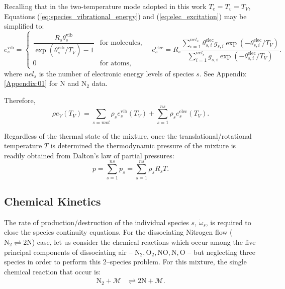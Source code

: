 \documentclass[10pt]{article}
\newcommand{\elec}{\text{elec}}
\newcommand{\vib}{\text{vib}}
\begin{document}
Recalling that  in the two-temperature mode adopted in this work $T_e=T_v= T_V$, Equations (\ref{eq:species_vibrational_energy}) and (\ref{eq:elec_excitation}) may be simplified to:
\begin{equation*}
  e^{\text{vib}}_s = 
  \begin{cases}    
    \dfrac{R_s\theta^{\vib}_{s}}{\exp\left(\theta^{\vib}_{s}/T_V\right) - 1} & \text{for molecules}, \\
    0 & \text{for atoms},
  \end{cases}
\quad
e^{\elec}_s = R_s \dfrac{\sum_{i=1}^{nel_s} \theta^{\elec}_{s,i} g_{s,i} \exp\left(-\theta^{\elec}_{s,i}/T_V\right)}{ \sum_{i=1}^{nel_s} g_{s,i} \exp\left(-\theta^{\elec}_{s,i}/T_V\right)}.
\end{equation*}
where $nel_s$ is the number of electronic energy levels of species $s$. See Appendix \ref{Appendix:01} for N and N$_2$ data.

Therefore, 
\begin{equation}
  \label{eq:rev-Tv-relationship}
  \rho e_V\left(T_V\right) = \sum_{s=mol} \rho_s e^{\text{vib}}_s\left(T_V\right) + \sum_{s=1}^{ns} \rho_s e^{\text{elec}}_s\left(T_V\right).
\end{equation}

Regardless of the thermal state of the mixture, once the translational/rotational temperature $T$ is determined the thermodynamic pressure of the mixture is readily obtained from Dalton's law of partial pressures:
\begin{equation}
 p = \sum_{s=1}^{ns} p_s = \sum_{s=1}^{ns} \rho_s R_s T .
 \label{eq:p_eq_state}
\end{equation}



\subsection{Chemical Kinetics}
The rate of production/destruction of the individual species $s$, $\dot{\omega}_s$, is required to close the species continuity equations. For the dissociating Nitrogen flow ($  \text{N}_2 \rightleftharpoons 2 \text{N}$) case, let us consider the chemical reactions which occur among the five principal components of dissociating air -- $\text{N}_2,\text{O}_2,\text{NO},\text{N},\text{O}$ -- but neglecting three species in order to perform this 2--species problem. For this mixture, the single chemical reaction that occur is:
\begin{align*}
 \text{N}_2 + \mathcal{M} &\rightleftharpoons 2\text{N} + \mathcal{M} .
\end{align*}
\end{document}
